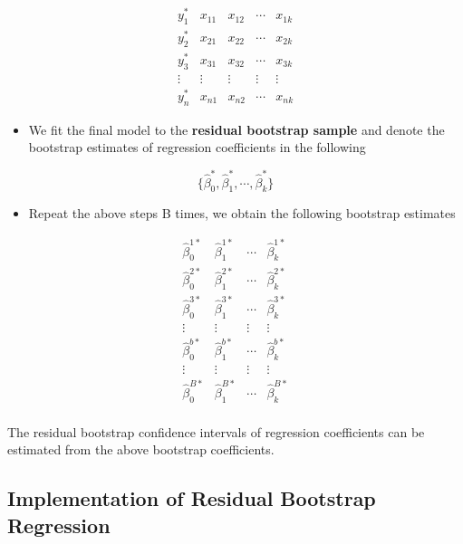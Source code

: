\documentclass[
]{book}
\providecommand{\tightlist}{%
  \setlength{\itemsep}{0pt}\setlength{\parskip}{0pt}}
\begin{document}
\[
\begin{array}{cccccc} 
y_1^{*} &  x_{11} &  x_{12} & \cdots & x_{1k}  \\
y_2^{*} &  x_{21} &  x_{22} & \cdots & x_{2k}  \\
y_3^{*} &  x_{31} &  x_{32} & \cdots & x_{3k}  \\
\vdots  &  \vdots &  \vdots & \vdots & \vdots  \\
y_n^{*} &  x_{n1} &  x_{n2} & \cdots & x_{nk} 
\end{array}
\]

\begin{itemize}
\tightlist
\item
  We fit the final model to the \textbf{residual bootstrap sample} and denote the bootstrap estimates of regression coefficients in the following
\end{itemize}

\[
\{ \hat{\beta}_0^{*}, \hat{\beta}_1^{*},  \cdots, \hat{\beta}_k^{*} \}
\]

\begin{itemize}
\tightlist
\item
  Repeat the above steps B times, we obtain the following bootstrap estimates
\end{itemize}

\[
\begin{array}{cccccc} 
\hat{\beta}_0^{1*} & \hat{\beta}_1^{1*} &  \cdots  & \hat{\beta}_k^{1*}  \\
\hat{\beta}_0^{2*} & \hat{\beta}_1^{2*} &  \cdots  & \hat{\beta}_k^{2*}  \\
\hat{\beta}_0^{3*} & \hat{\beta}_1^{3*} &  \cdots  & \hat{\beta}_k^{3*}  \\
\vdots  &  \vdots &  \vdots & \vdots  \\
\hat{\beta}_0^{b*} & \hat{\beta}_1^{b*} &  \cdots  & \hat{\beta}_k^{b*}  \\
\vdots  &  \vdots &  \vdots & \vdots  \\
\hat{\beta}_0^{B*} & \hat{\beta}_1^{B*} &  \cdots  & \hat{\beta}_k^{B*}  \\
\end{array}
\]

The residual bootstrap confidence intervals of regression coefficients can be estimated from the above bootstrap coefficients.

\hypertarget{implementation-of-residual-bootstrap-regression}{%
\subsection{Implementation of Residual Bootstrap Regression}\label{implementation-of-residual-bootstrap-regression}}
\end{document}
